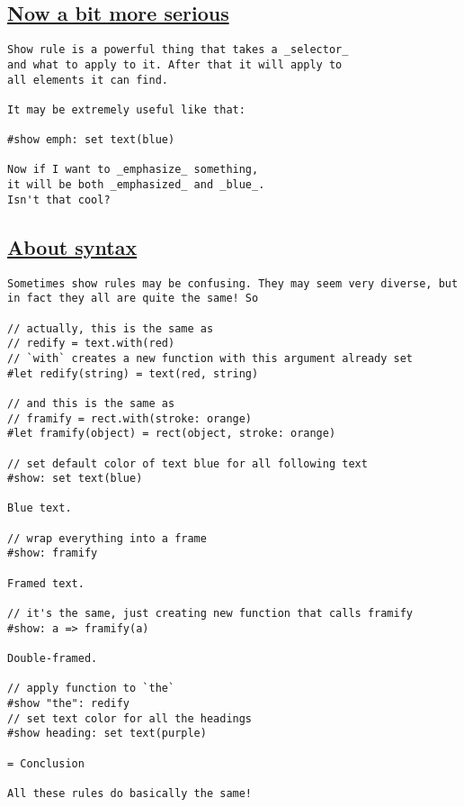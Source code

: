 \pandocbounded{}

\subsection{\texorpdfstring{\hyperref[now-a-bit-more-serious]{Now a bit
more serious}}{Now a bit more serious}}\label{now-a-bit-more-serious}

\begin{verbatim}
Show rule is a powerful thing that takes a _selector_
and what to apply to it. After that it will apply to
all elements it can find.

It may be extremely useful like that:

#show emph: set text(blue)

Now if I want to _emphasize_ something,
it will be both _emphasized_ and _blue_.
Isn't that cool?
\end{verbatim}

\pandocbounded{}

\subsection{\texorpdfstring{\hyperref[about-syntax]{About
syntax}}{About syntax}}\label{about-syntax}

\begin{verbatim}
Sometimes show rules may be confusing. They may seem very diverse, but in fact they all are quite the same! So

// actually, this is the same as
// redify = text.with(red)
// `with` creates a new function with this argument already set
#let redify(string) = text(red, string)

// and this is the same as
// framify = rect.with(stroke: orange)
#let framify(object) = rect(object, stroke: orange)

// set default color of text blue for all following text
#show: set text(blue)

Blue text.

// wrap everything into a frame
#show: framify

Framed text.

// it's the same, just creating new function that calls framify
#show: a => framify(a)

Double-framed.

// apply function to `the`
#show "the": redify
// set text color for all the headings
#show heading: set text(purple)

= Conclusion

All these rules do basically the same!
\end{verbatim}

